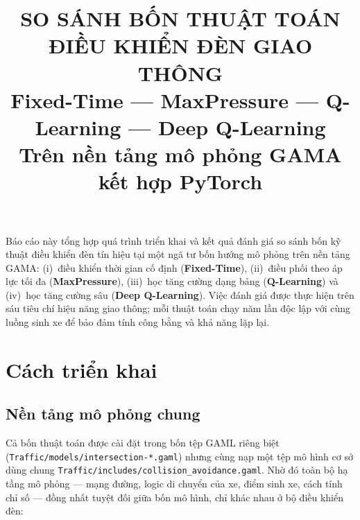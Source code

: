 \documentclass[11pt,a4paper]{article}
\title{\textbf{SO SÁNH BỐN THUẬT TOÁN ĐIỀU KHIỂN ĐÈN GIAO THÔNG}\\[3pt]
\large Fixed-Time --- MaxPressure --- Q-Learning --- Deep Q-Learning\\[4pt]
\normalsize Trên nền tảng mô phỏng GAMA kết hợp PyTorch}
\author{}
\date{}
\begin{document}
\maketitle
\vspace{-3em}

Báo cáo này tổng hợp quá trình triển khai và kết quả đánh giá so sánh bốn kỹ thuật
điều khiển đèn tín hiệu tại một ngã tư bốn hướng mô phỏng trên nền tảng GAMA:
(i)~điều khiển thời gian cố định (\textbf{Fixed-Time}), (ii)~điều phối theo áp lực
tối đa (\textbf{MaxPressure}), (iii)~học tăng cường dạng bảng (\textbf{Q-Learning})
và (iv)~học tăng cường sâu (\textbf{Deep Q-Learning}). Việc đánh giá được thực hiện
trên sáu tiêu chí hiệu năng giao thông; mỗi thuật toán chạy năm lần độc lập với cùng
luồng sinh xe để bảo đảm tính công bằng và khả năng lặp lại.

\section{Cách triển khai}

\subsection{Nền tảng mô phỏng chung}

Cả bốn thuật toán được cài đặt trong bốn tệp GAML riêng biệt
(\texttt{Traffic/models/}\allowbreak\texttt{intersection-*.gaml}) nhưng cùng nạp một
tệp mô hình cơ sở dùng chung \texttt{Traffic/includes/}\allowbreak\texttt{collision\_\allowbreak avoidance.gaml}. Nhờ đó toàn bộ hạ tầng
mô phỏng --- mạng đường, logic di chuyển của xe, điểm sinh xe, cách tính chỉ số ---
đồng nhất tuyệt đối giữa bốn mô hình, chỉ khác nhau ở bộ điều khiển đèn:
\end{document}
